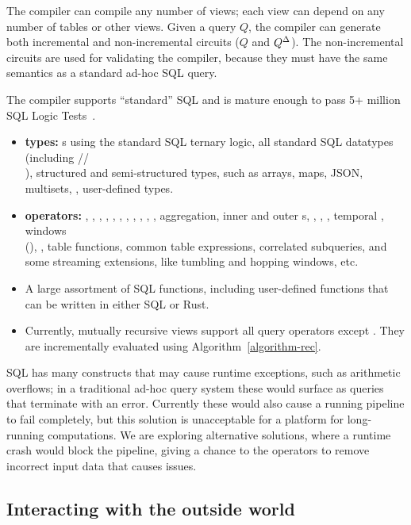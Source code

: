 The compiler can compile any number of views; each view can depend on
any number of tables or other views.  Given a query $Q$, the compiler
can generate both incremental and non-incremental circuits ($Q$ and
${Q}^{\Delta}$).  The non-incremental circuits are used for validating the
compiler, because they must have the same semantics as a standard
ad-hoc SQL query.

The compiler supports ``standard'' SQL and is mature enough to pass
5+ million SQL Logic Tests~\cite{sqllogictest}.
\begin{itemize}
\item \textbf{types:} s using the standard SQL ternary
  logic, all standard SQL datatypes (including
  //\\), structured and
  semi-structured types, such as arrays, maps, JSON, multisets,
  , user-defined types.
\item \textbf{operators:} , , ,
  ,  , ,
  , , , ,
  , aggregation, inner and outer s,
  , , , temporal ,
  windows \\ (), , table
  functions, common table expressions, correlated subqueries, and some
  streaming extensions, like tumbling and hopping windows, etc.
\item A large assortment of SQL functions, including user-defined
  functions that can be written in either SQL or Rust.
\item Currently, mutually recursive views support all query operators
  except .  They are incrementally evaluated using
  Algorithm~\ref{algorithm-rec}.
\end{itemize}

SQL has many constructs that may cause runtime exceptions, such as
arithmetic overflows; in a traditional ad-hoc query system these
would surface as queries that terminate with an error.  Currently
these would also cause a running pipeline to fail completely, but this
solution is unacceptable for a platform for long-running computations.
We are exploring alternative solutions, where a runtime crash would
block the pipeline, giving a chance to the operators to remove
incorrect input data that causes issues.

\subsection{Interacting with the outside world}

